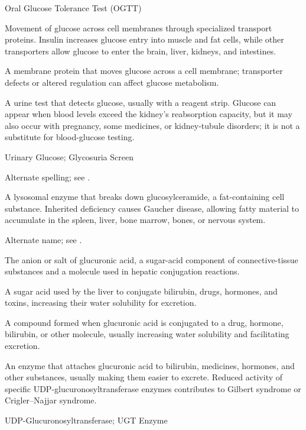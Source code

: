 \synonyms
Oral Glucose Tolerance Test (OGTT)

 Movement of glucose across cell membranes through specialized transport proteins. Insulin increases glucose entry into muscle and fat cells, while other transporters allow glucose to enter the brain, liver, kidneys, and intestines.

 A membrane protein that moves glucose across a cell membrane; transporter defects or altered regulation can affect glucose metabolism.

 A urine test that detects glucose, usually with a reagent strip. Glucose can appear when blood levels exceed the kidney’s reabsorption capacity, but it may also occur with pregnancy, some medicines, or kidney-tubule disorders; it is not a substitute for blood-glucose testing.

\synonyms
Urinary Glucose; Glycosuria Screen

 Alternate spelling; see .

 A lysosomal enzyme that breaks down glucosylceramide, a fat-containing cell substance. Inherited deficiency causes Gaucher disease, allowing fatty material to accumulate in the spleen, liver, bone marrow, bones, or nervous system.

 Alternate name; see .

 The anion or salt of glucuronic acid, a sugar-acid component of connective-tissue substances and a molecule used in hepatic conjugation reactions.

 A sugar acid used by the liver to conjugate bilirubin, drugs, hormones, and toxins, increasing their water solubility for excretion.

 A compound formed when glucuronic acid is conjugated to a drug, hormone, bilirubin, or other molecule, usually increasing water solubility and facilitating excretion.

 An enzyme that attaches glucuronic acid to bilirubin, medicines, hormones, and other substances, usually making them easier to excrete. Reduced activity of specific UDP-glucuronosyltransferase enzymes contributes to Gilbert syndrome or Crigler--Najjar syndrome.

\synonyms
UDP-Glucuronosyltransferase; UGT Enzyme


